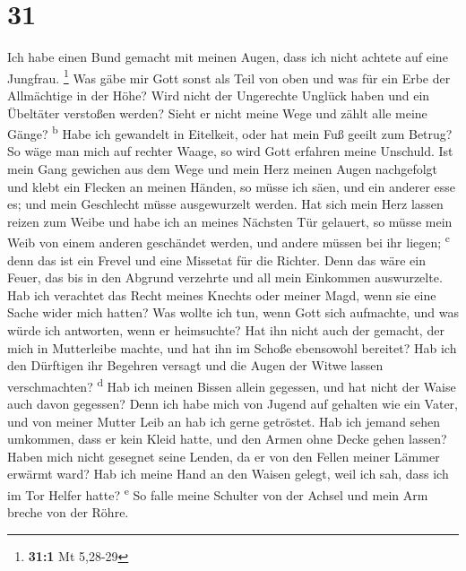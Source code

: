 \hypertarget{section-30}{%
\section{31}\label{section-30}}

 Ich habe einen Bund gemacht mit meinen Augen, dass ich
nicht achtete auf eine Jungfrau. \footnote{\textbf{31:1} Mt 5,28-29}
 Was gäbe mir Gott sonst als Teil von oben und was für ein
Erbe der Allmächtige in der Höhe?  Wird nicht der
Ungerechte Unglück haben und ein Übeltäter verstoßen werden?
 Sieht er nicht meine Wege und zählt alle meine Gänge?
\textsuperscript{b}  Habe ich gewandelt in Eitelkeit, oder
hat mein Fuß geeilt zum Betrug?  So wäge man mich auf
rechter Waage, so wird Gott erfahren meine Unschuld.  Ist
mein Gang gewichen aus dem Wege und mein Herz meinen Augen nachgefolgt
und klebt ein Flecken an meinen Händen,  so müsse ich
säen, und ein anderer esse es; und mein Geschlecht müsse ausgewurzelt
werden.  Hat sich mein Herz lassen reizen zum Weibe und
habe ich an meines Nächsten Tür gelauert,  so müsse mein
Weib von einem anderen geschändet werden, und andere müssen bei ihr
liegen; \textsuperscript{c}  denn das ist ein Frevel und
eine Missetat für die Richter.  Denn das wäre ein Feuer,
das bis in den Abgrund verzehrte und all mein Einkommen auswurzelte.
 Hab ich verachtet das Recht meines Knechts oder meiner
Magd, wenn sie eine Sache wider mich hatten?  Was wollte
ich tun, wenn Gott sich aufmachte, und was würde ich antworten, wenn er
heimsuchte?  Hat ihn nicht auch der gemacht, der mich in
Mutterleibe machte, und hat ihn im Schoße ebensowohl bereitet?
 Hab ich den Dürftigen ihr Begehren versagt und die Augen
der Witwe lassen verschmachten? \textsuperscript{d}  Hab
ich meinen Bissen allein gegessen, und hat nicht der Waise auch davon
gegessen?  Denn ich habe mich von Jugend auf gehalten wie
ein Vater, und von meiner Mutter Leib an hab ich gerne getröstet.
 Hab ich jemand sehen umkommen, dass er kein Kleid hatte,
und den Armen ohne Decke gehen lassen?  Haben mich nicht
gesegnet seine Lenden, da er von den Fellen meiner Lämmer erwärmt ward?
 Hab ich meine Hand an den Waisen gelegt, weil ich sah,
dass ich im Tor Helfer hatte? \textsuperscript{e}  So
falle meine Schulter von der Achsel und mein Arm breche von der Röhre.
